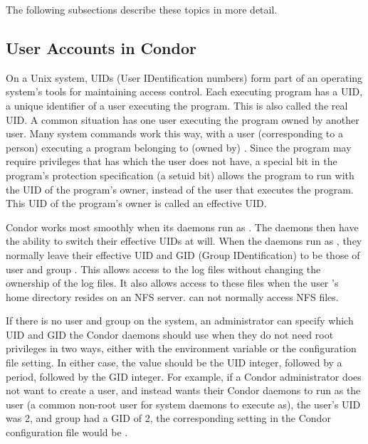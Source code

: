 The following subsections describe these topics in more detail. 

\subsection{\label{sec:uids}User Accounts in Condor}


On a Unix system,
UIDs (User IDentification numbers) form part of an operating system's
tools for maintaining access control.
Each executing program has a UID,
a unique identifier of a user executing the program.
This is also called the real UID.
A common situation has one user executing the program owned
by another user.
Many system commands work this way, with a user (corresponding
to a person) executing a program belonging to (owned by) .
Since the program may require privileges that  has which
the user does not have, a special bit in the program's
protection specification (a setuid bit) allows the program
to run with the UID of the program's owner, instead of the
user that executes the program.
This UID of the program's owner is called an effective UID.

Condor works most smoothly when its daemons run as .
The daemons then have the ability to switch their 
effective UIDs at will.
When the daemons run as ,
they normally leave their effective UID and GID (Group IDentification)
to be those of user and group .
This allows access to the log files without
changing the ownership of the log files.
It also allows access to these files when
the user 's home directory resides on an NFS server.
 can not normally access NFS files.

If there is no  user and group on the system, an
administrator can specify which UID and GID the Condor daemons should
use when they do not need root privileges in two ways, 
either with the  environment variable or the
 configuration file setting.
In either case, the value should be the UID integer, followed by a
period, followed by the GID integer.
For example, if a Condor administrator does not want to create a
 user, and instead wants their Condor daemons to run as
the  user (a common non-root user for system daemons to
execute as), the  user's UID was 2, and group
 had a GID of 2, the corresponding setting in the Condor
configuration file would be .

